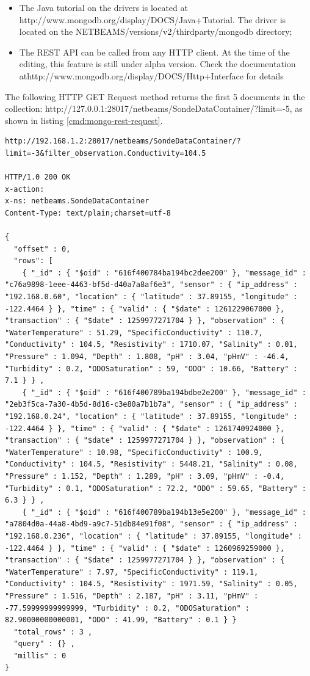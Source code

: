 \begin{itemize}
  \item The Java tutorial on the drivers is located at
    http://www.mongodb.org/display/DOCS/Java+Tutorial. The driver is located on
    the NETBEAMS/versions/v2/thirdparty/mongodb directory;  
  \item The REST API can be called from any HTTP client. At the time of the
  editing, this feature is still under alpha version. Check the documentation
  athttp://www.mongodb.org/display/DOCS/Http+Interface for details 
\end{itemize}

The following HTTP GET Request method returns the first 5 documents in the collection:
http://127.0.0.1:28017/netbeams/SondeDataContainer/?limit=-5, as shown in
listing \ref{cmd:mongo-rest-request}.

\lstset{label=cmd:mongo-rest-request,caption=REST HTTP GET Request Example}
\begin{lstlisting}
http://192.168.1.2:28017/netbeams/SondeDataContainer/?limit=-3&filter_observation.Conductivity=104.5

HTTP/1.0 200 OK
x-action:
x-ns: netbeams.SondeDataContainer
Content-Type: text/plain;charset=utf-8

{
  "offset" : 0,
  "rows": [
    { "_id" : { "$oid" : "616f400784ba194bc2dee200" }, "message_id" : "c76a9898-1eee-4463-bf5d-d40a7a8af6e3", "sensor" : { "ip_address" : "192.168.0.60", "location" : { "latitude" : 37.89155, "longitude" : -122.4464 } }, "time" : { "valid" : { "$date" : 1261229067000 }, "transaction" : { "$date" : 1259977271704 } }, "observation" : { "WaterTemperature" : 51.29, "SpecificConductivity" : 110.7, "Conductivity" : 104.5, "Resistivity" : 1710.07, "Salinity" : 0.01, "Pressure" : 1.094, "Depth" : 1.808, "pH" : 3.04, "pHmV" : -46.4, "Turbidity" : 0.2, "ODOSaturation" : 59, "ODO" : 10.66, "Battery" : 7.1 } } ,
    { "_id" : { "$oid" : "616f400789ba194bdbe2e200" }, "message_id" : "2eb3f5ca-7a30-4b5d-8d16-c3e80a7b1b7a", "sensor" : { "ip_address" : "192.168.0.24", "location" : { "latitude" : 37.89155, "longitude" : -122.4464 } }, "time" : { "valid" : { "$date" : 1261740924000 }, "transaction" : { "$date" : 1259977271704 } }, "observation" : { "WaterTemperature" : 10.98, "SpecificConductivity" : 100.9, "Conductivity" : 104.5, "Resistivity" : 5448.21, "Salinity" : 0.08, "Pressure" : 1.152, "Depth" : 1.289, "pH" : 3.09, "pHmV" : -0.4, "Turbidity" : 0.1, "ODOSaturation" : 72.2, "ODO" : 59.65, "Battery" : 6.3 } } ,
    { "_id" : { "$oid" : "616f400789ba194b13e5e200" }, "message_id" : "a7804d0a-44a8-4bd9-a9c7-51db84e91f08", "sensor" : { "ip_address" : "192.168.0.236", "location" : { "latitude" : 37.89155, "longitude" : -122.4464 } }, "time" : { "valid" : { "$date" : 1260969259000 }, "transaction" : { "$date" : 1259977271704 } }, "observation" : { "WaterTemperature" : 7.97, "SpecificConductivity" : 119.1, "Conductivity" : 104.5, "Resistivity" : 1971.59, "Salinity" : 0.05, "Pressure" : 1.516, "Depth" : 2.187, "pH" : 3.11, "pHmV" : -77.59999999999999, "Turbidity" : 0.2, "ODOSaturation" : 82.90000000000001, "ODO" : 41.99, "Battery" : 0.1 } }
  "total_rows" : 3 ,
  "query" : {} ,
  "millis" : 0
}
\end{lstlisting}

